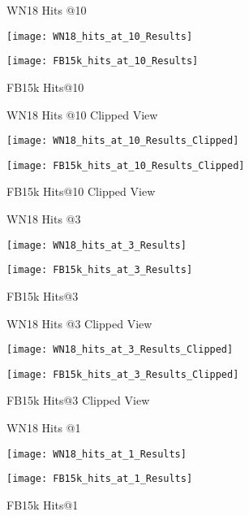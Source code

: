 
\begin{figure}[H]
	\parbox{.5\linewidth}{
   		\caption{WN18 Hits @10}
   		\centering
    		\texttt{[image: WN18\_hits\_at\_10\_Results]}
		}
	\hfill
	\parbox{.5\linewidth}{
		\caption{FB15k Hits@10}
   		\centering
		\texttt{[image: FB15k\_hits\_at\_10\_Results]}
		}
\end{figure}

\begin{figure}[H]
	\parbox{.5\linewidth}{
   		\caption{WN18 Hits @10 Clipped View}
   		\centering
    		\texttt{[image: WN18\_hits\_at\_10\_Results\_Clipped]}
		}
	\hfill
	\parbox{.5\linewidth}{
		\caption{FB15k Hits@10  Clipped View}
   		\centering
		\texttt{[image: FB15k\_hits\_at\_10\_Results\_Clipped]}
		}
\end{figure}


\begin{figure}[H]
	\parbox{.5\linewidth}{
   		\caption{WN18 Hits @3}
   		\centering
    		\texttt{[image: WN18\_hits\_at\_3\_Results]}
		}
	\hfill
	\parbox{.5\linewidth}{
		\caption{FB15k Hits@3}
   		\centering
		\texttt{[image: FB15k\_hits\_at\_3\_Results]}
		}
\end{figure}

\begin{figure}[H]
	\parbox{.5\linewidth}{
   		\caption{WN18 Hits @3 Clipped View}
   		\centering
    		\texttt{[image: WN18\_hits\_at\_3\_Results\_Clipped]}
		}
	\hfill
	\parbox{.5\linewidth}{
		\caption{FB15k Hits@3  Clipped View}
   		\centering
		\texttt{[image: FB15k\_hits\_at\_3\_Results\_Clipped]}
		}
\end{figure}


\begin{figure}[H]
	\parbox{.5\linewidth}{
   		\caption{WN18 Hits @1}
   		\centering
    		\texttt{[image: WN18\_hits\_at\_1\_Results]}
		}
	\hfill
	\parbox{.5\linewidth}{
		\caption{FB15k Hits@1}
   		\centering
		\texttt{[image: FB15k\_hits\_at\_1\_Results]}
		}
\end{figure}


